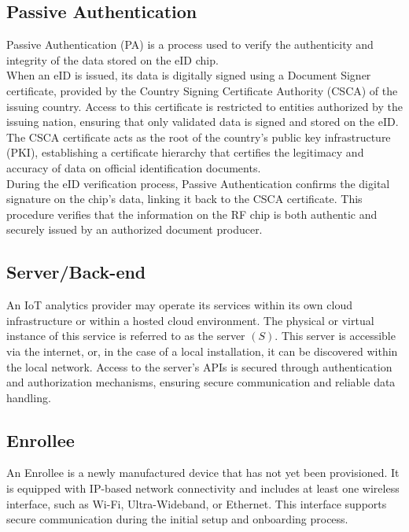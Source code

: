 \documentclass[pdflatex,sn-mathphys-num]{sn-jnl}%
\theoremstyle{thmstyleone}%
\theoremstyle{thmstyletwo}%
\theoremstyle{thmstylethree}%
\begin{document}
\subsection*{Passive Authentication}

Passive Authentication (PA) is a process used to verify the authenticity and integrity of the data stored on the eID chip.\\

When an eID is issued, its data is digitally signed using a Document Signer certificate, provided by the Country Signing Certificate Authority (CSCA) of the issuing country. Access to this certificate is restricted to entities authorized by the issuing nation, ensuring that only validated data is signed and stored on the eID. The CSCA certificate acts as the root of the country’s public key infrastructure (PKI), establishing a certificate hierarchy that certifies the legitimacy and accuracy of data on official identification documents.\\

During the eID verification process, Passive Authentication confirms the digital signature on the chip’s data, linking it back to the CSCA certificate. This procedure verifies that the information on the RF chip is both authentic and securely issued by an authorized document producer.


\subsection*{Server/Back-end}

An IoT analytics provider may operate its services within its own cloud infrastructure or within a hosted cloud environment. The physical or virtual instance of this service is referred to as the server $(S)$. This server is accessible via the internet, or, in the case of a local installation, it can be discovered within the local network. Access to the server's APIs is secured through authentication and authorization mechanisms, ensuring secure communication and reliable data handling.


\subsection*{Enrollee}

An Enrollee is a newly manufactured device that has not yet been provisioned. It is equipped with IP-based network connectivity and includes at least one wireless interface, such as Wi-Fi, Ultra-Wideband, or Ethernet. This interface supports secure communication during the initial setup and onboarding process.
\end{document}

